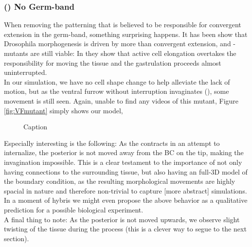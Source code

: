 


\subsubsection{() No Germ-band }
\label{sec:mutantNoGB}
When removing the patterning that is believed to be responsible for convergent extension in the germ-band, something surprising happens. It has been show that Drosophila morphogenesis is driven by more than convergent extension, and -mutants are still viable: In  they show that active cell elongation overtakes the responsibility for moving the tissue and the gastrulation proceeds almost uninterrupted.\\

In our simulation, we have no cell shape change to help alleviate the lack of motion, but as the ventral furrow without interruption invaginates (), some movement is still seen. 
Again, unable to find any videos of this mutant, Figure \ref{fig:VFmutant} simply shows our model,

\begin{figure}[H]
    \centering

    \caption{Caption}
    \label{fig:germ-band-mutant}
\end{figure}

Especially interesting is the following: As the  contracts in an attempt to internalize, the posterior is not moved away from the BC on the tip, making the invagination impossible. This is a clear testament to the importance of not only having  connections to the surrounding tissue, but also having an full-3D model of the boundary condition, as the resulting morphological movements are highly spacial in nature and therefore non-trivial to capture [more abstract] simulations. In a moment of hybris we might even propose the above behavior as a qualitative prediction for a possible biological experiment.\\  
A final thing to note: As the posterior is not moved upwards, we observe slight twisting of the tissue during the process (this is a clever way to segue to the next section). 


